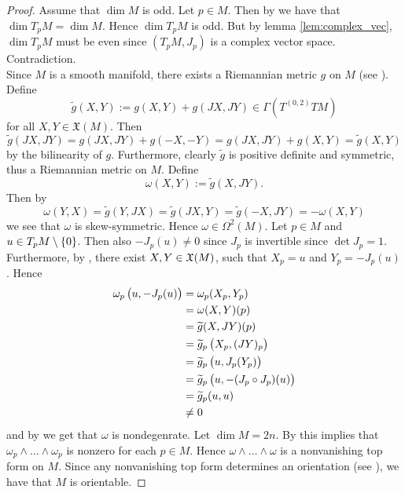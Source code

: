 \begin{proof}
Assume that $\dim M$ is odd. Let $p \in M$. Then by \cite[57]{lee:smooth_manifolds:2013} we have that $\dim T_p M = \dim M$. Hence $\dim T_pM$ is odd. But by lemma \ref{lem:complex_vec}, $\dim T_p M$ must be even since $(T_pM,J_p)$ is a complex vector space. Contradiction.\\
Since $M$ is a smooth manifold, there exists a Riemannian metric $g$ on $M$ (see \cite[329]{lee:smooth_manifolds:2013}). Define 
\begin{equation*}
\widetilde{g}(X,Y) := g(X,Y) + g(JX,JY) \in \Gamma(T^{(0,2)}TM)
\end{equation*}
\noindent for all $X,Y \in \mathfrak{X}(M)$. Then
\begin{equation*}
\widetilde{g}(JX,JY) = g(JX,JY) + g(-X,-Y) = g(JX,JY) + g(X,Y) = \widetilde{g}(X,Y)
\end{equation*}
\noindent by the bilinearity of $g$. Furthermore, clearly $\widetilde{g}$ is positive definite and symmetric, thus a Riemannian metric on $M$. Define
\begin{equation*}
\omega(X,Y) := \widetilde{g}(X,JY).
\end{equation*}
Then by
\begin{equation*}
\omega(Y,X) = \widetilde{g}(Y,JX) = \widetilde{g}(JX,Y) = \widetilde{g}(-X,JY) = -\omega(X,Y)
\end{equation*}
\noindent we see that $\omega$ is skew-symmetric. Hence $\omega \in \Omega^2(M)$. Let $p \in M$ and $u \in T_pM \setminus \cbr{0}$. Then also $-J_p(u) \neq 0$ since $J_p$ is invertible since $\det J_p = 1$. Furthermore, by \cite[177]{lee:smooth_manifolds:2013}, there exist $X,Y \in \mathfrak{X}(M)$, such that $X_p = u$ and $Y_p = -J_p(u)$. Hence
\begin{align*}
\omega_p\del[1]{u,-J_p(u)} &= \omega_p(X_p,Y_p)\\
&= \omega(X,Y)(p)\\
&= \widetilde{g}(X,JY)(p)\\
&= \widetilde{g}_p\del[1]{X_p,(JY)_p}\\
&= \widetilde{g}_p\del[1]{u,J_p(Y_p)}\\
&= \widetilde{g}_p\del[1]{u,-(J_p \circ J_p)(u)}\\
&= \widetilde{g}_p(u,u)\\
&\neq 0
\end{align*}
\noindent and by \cite[565]{lee:smooth_manifolds:2013} we get that $\omega$ is nondegenrate. Let $\dim M = 2n$. By \cite[567]{lee:smooth_manifolds:2013} this implies that $\omega_p \wedge \dots \wedge \omega_p$ is nonzero for each $p \in M$. Hence $\omega \wedge \dots \wedge \omega$ is a nonvanishing top form on $M$. Since any nonvanishing top form determines an orientation (see \cite[381]{lee:smooth_manifolds:2013}), we have that $M$ is orientable.
\end{proof}

